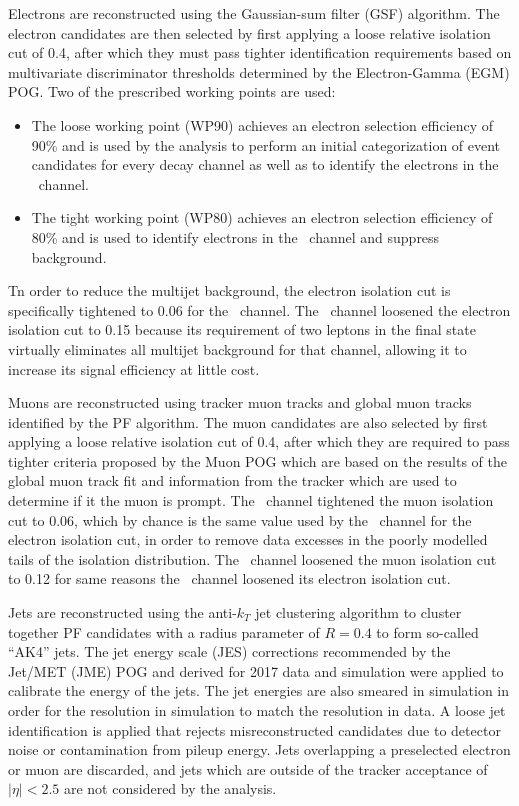 Electrons are reconstructed using the Gaussian-sum filter (GSF) algorithm.\cite{GSFTRACK} The electron candidates are then selected by first applying a loose relative isolation cut of 0.4, after which they must pass tighter identification requirements based on multivariate discriminator thresholds determined by the Electron-Gamma (EGM) POG. Two of the prescribed working points are used:
\begin{itemize}
  \item The loose working point (WP90) achieves an electron selection efficiency of 90\% and is used by the analysis to perform an initial categorization of event candidates for every decay channel as well as to identify the electrons in the \ZeeH\ channel.
  \item The tight working point (WP80) achieves an electron selection efficiency of 80\% and is used to identify electrons in the \WenH\ channel and suppress background.
\end{itemize}
Tn order to reduce the multijet background, the electron isolation cut is specifically tightened to 0.06 for the \WenH\ channel. The \ZeeH\ channel loosened the electron isolation cut to 0.15 because its requirement of two leptons in the final state virtually eliminates all multijet background for that channel, allowing it to increase its signal efficiency at little cost.

Muons are reconstructed using tracker muon tracks and global muon tracks identified by the PF algorithm. The muon candidates are also selected by first applying a loose relative isolation cut of 0.4, after which they are required to pass tighter criteria proposed by the Muon POG which are based on the results of the global muon track fit and information from the tracker which are used to determine if it the muon is prompt. The \WmnH\ channel tightened the muon isolation cut to 0.06, which by chance is the same value used by the \WenH\ channel for the electron isolation cut, in order to remove data excesses in the poorly modelled tails of the isolation distribution. The \ZmmH\ channel loosened the muon isolation cut to 0.12 for same reasons the \ZeeH\ channel loosened its electron isolation cut.

Jets are reconstructed using the anti-$k_{T}$ jet clustering algorithm\cite{ANTIKT} to cluster together PF candidates with a radius parameter of $R = 0.4$ to form so-called ``AK4'' jets. The jet energy scale (JES) corrections recommended by the Jet/MET (JME) POG and derived for 2017 data and simulation were applied to calibrate the energy of the jets. The jet energies are also smeared in simulation in order for the resolution in simulation to match the resolution in data. A loose jet identification is applied that rejects misreconstructed candidates due to detector noise or contamination from pileup energy. Jets overlapping a preselected electron or muon are discarded, and jets which are outside of the tracker acceptance of $\left| \eta \right| < 2.5$ are not considered by the analysis.


